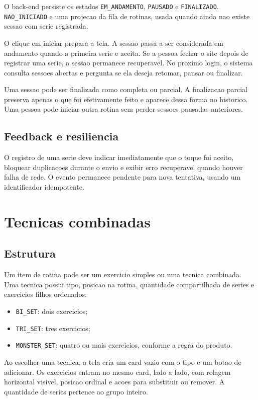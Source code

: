 \documentclass[12pt,a4paper]{article}
\begin{document}
O back-end persiste os estados \texttt{EM\_ANDAMENTO}, \texttt{PAUSADO} e \texttt{FINALIZADO}. \texttt{NAO\_INICIADO} e uma projecao da fila de rotinas, usada quando ainda nao existe sessao com serie registrada.

O clique em iniciar prepara a tela. A sessao passa a ser considerada em andamento quando a primeira serie e aceita. Se a pessoa fechar o site depois de registrar uma serie, a sessao permanece recuperavel. No proximo login, o sistema consulta sessoes abertas e pergunta se ela deseja retomar, pausar ou finalizar.

Uma sessao pode ser finalizada como completa ou parcial. A finalizacao parcial preserva apenas o que foi efetivamente feito e aparece dessa forma no historico. Uma pessoa pode iniciar outra rotina sem perder sessoes pausadas anteriores.

\subsection{Feedback e resiliencia}

O registro de uma serie deve indicar imediatamente que o toque foi aceito, bloquear duplicacoes durante o envio e exibir erro recuperavel quando houver falha de rede. O evento permanece pendente para nova tentativa, usando um identificador idempotente.

\section{Tecnicas combinadas}

\subsection{Estrutura}

Um item de rotina pode ser um exercicio simples ou uma tecnica combinada. Uma tecnica possui tipo, posicao na rotina, quantidade compartilhada de series e exercicios filhos ordenados:

\begin{itemize}[leftmargin=*]
    \item \texttt{BI\_SET}: dois exercicios;
    \item \texttt{TRI\_SET}: tres exercicios;
    \item \texttt{MONSTER\_SET}: quatro ou mais exercicios, conforme a regra do produto.
\end{itemize}

Ao escolher uma tecnica, a tela cria um card vazio com o tipo e um botao de adicionar. Os exercicios entram no mesmo card, lado a lado, com rolagem horizontal visivel, posicao ordinal e acoes para substituir ou remover. A quantidade de series pertence ao grupo inteiro.
\end{document}
